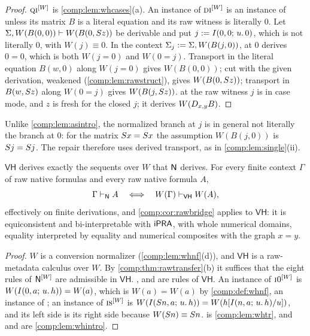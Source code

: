 \begin{proof}
$\rulename{QI}^{[W]}$ is \cref{comp:lem:whcases}(a). An instance of
$\rulename{DI}^{[W]}$ is an instance of  unless its matrix $B$
is a literal equation and its raw witness is literally $0$. Let
$\Sigma,W(B(0,0))\vdash W(B(0,S z))$ be derivable and put
$j\mathrel{:=}I(0,0;\,u.\,0)$, which is not literally $0$, with $W(j)\equiv0$. In
the context $\Sigma_j\mathrel{:=}\Sigma,W(B(j,0))$,  at $0$ derives
$0=0$, which is both $W(j=0)$ and $W(0=j)$. Transport in the literal equation
$B(w,0)$ along $W(j=0)$ gives $W(B(0,0))$; cut with the given derivation,
weakened (\cref{comp:lem:rawstruct}), gives $W(B(0,S z))$; transport in
$B(w,S z)$ along $W(0=j)$ gives $W(B(j,S z))$.  at the raw
witness $j$ is in case mode, and $z$ is fresh for the closed $j$; it derives
$W(D_{x,y}B)$.
\end{proof}

Unlike \cref{comp:lem:asintro}, the normalized branch at $j$ is in general
not literally the branch at $0$: for the matrix $S x=S x$ the
assumption $W(B(j,0))$ is $S j=S j$. The repair therefore uses
derived transport, as in \cref{comp:lem:single}(ii).

\begin{theorem}
\label{comp:thm:vh}
$\mathsf{VH}$ derives exactly the sequents over $W$ that $\mathsf{N}$ derives. For
every finite context $\Gamma$ of raw native formulas and every raw native
formula $A$,
\[
 \Gamma\vdash_{\mathsf{N}}A
 \quad\Longleftrightarrow\quad
 W(\Gamma)\vdash_{\mathsf{VH}}W(A),
\]
effectively on finite derivations, and \cref{comp:cor:rawbridge} applies to
$\mathsf{VH}$: it is equiconsistent and bi-interpretable with $\mathsf{iPRA}$, with
whole numerical domains, equality interpreted by equality and numerical
composites with the graph $x=y$.
\end{theorem}

\begin{proof}
$W$ is a conversion normalizer (\cref{comp:lem:whnf}(d)), and $\mathsf{VH}$
is a raw-metadata calculus over $W$. By \cref{comp:thm:rawtransfer}(b) it
suffices that the eight rules of $\mathsf{N}^{[W]}$ are admissible in
$\mathsf{VH}$. ,  and  are rules of
$\mathsf{VH}$. An instance of $\rulename{I0}^{[W]}$ is
$W(I(0,a;\,u.\,h))=W(a)$, which is $W(a)=W(a)$ by \cref{comp:def:whnf}, an
instance of ; an instance of $\rulename{IS}^{[W]}$ is
$W(I(S n,a;\,u.\,h))=W(h[I(n,a;\,u.\,h)/u])$, and its left side
is its right side because $W(S n)\equiv S n$.  is
\cref{comp:lem:whtr}, and  and  are
\cref{comp:lem:whintro}.
\end{proof}

